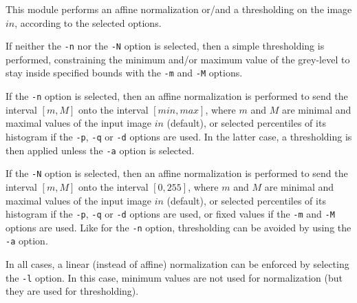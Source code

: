 
This module performs an affine normalization or/and a thresholding
on the image $in$, according to the selected options.

\medskip

If neither the \verb+-n+ nor the \verb+-N+ option is selected,
then a simple thresholding is performed, constraining the 
minimum and/or maximum value of the grey-level to stay
inside specified bounds with the \verb+-m+ and \verb+-M+ options.

\medskip

If the \verb+-n+ option is selected, then an affine normalization
is performed to send the interval $[m,M]$ onto the interval $[min,max]$,
where $m$ and $M$ are minimal and maximal values of the input image
$in$ (default), or selected percentiles of its histogram if the \verb+-p+,
\verb+-q+ or \verb+-d+ options are used. In the latter case, a thresholding
is then applied unless the \verb+-a+ option is selected.

\medskip

If the \verb+-N+ option is selected, then an affine normalization
is performed to send the interval $[m,M]$ onto the interval $[0,255]$,
where $m$ and $M$ are minimal and maximal values of the input image
$in$ (default), or selected percentiles of its histogram if the \verb+-p+,
\verb+-q+ or \verb+-d+ options are used, or fixed values if the \verb+-m+
and \verb+-M+ options are used. Like for the \verb+-n+ option, thresholding
can be avoided by using the \verb+-a+ option.

\medskip

In all cases, a linear (instead of affine) normalization can be enforced
by selecting the \verb+-l+ option. In this case, minimum values are not
used for normalization (but they are used for thresholding).
